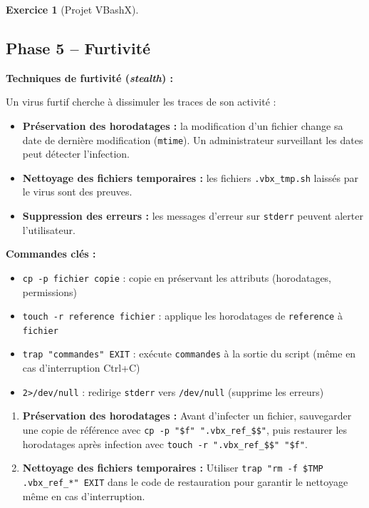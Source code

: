 \documentclass[a4paper,11pt]{article}
\theoremstyle{plain}
\theoremstyle{definition}
\newtheorem{exercice}{Exercice}
\begin{document}
\begin{exercice}[Projet VBashX]
\subsection*{Phase 5 -- Furtivité}

\begin{rappel}
\textbf{Techniques de furtivité (\textit{stealth}) :}

Un virus furtif cherche à dissimuler les traces de son activité :
\begin{itemize}
    \item \textbf{Préservation des horodatages :} la modification d'un fichier change sa date de dernière modification (\texttt{mtime}). Un administrateur surveillant les dates peut détecter l'infection.
    \item \textbf{Nettoyage des fichiers temporaires :} les fichiers \texttt{.vbx\_tmp.sh} laissés par le virus sont des preuves.
    \item \textbf{Suppression des erreurs :} les messages d'erreur sur \texttt{stderr} peuvent alerter l'utilisateur.
\end{itemize}

\textbf{Commandes clés :}
\begin{itemize}
    \item \texttt{cp -p fichier copie} : copie en préservant les attributs (horodatages, permissions)
    \item \texttt{touch -r reference fichier} : applique les horodatages de \texttt{reference} à \texttt{fichier}
    \item \texttt{trap "commandes" EXIT} : exécute \texttt{commandes} à la sortie du script (même en cas d'interruption Ctrl+C)
    \item \texttt{2>/dev/null} : redirige \texttt{stderr} vers \texttt{/dev/null} (supprime les erreurs)
\end{itemize}
\end{rappel}

\begin{enumerate}
\item[\textbf{5a)}] \textbf{Préservation des horodatages :} Avant d'infecter un fichier, sauvegarder une copie de référence avec \texttt{cp -p "\$f" ".vbx\_ref\_\$\$"}, puis restaurer les horodatages après infection avec \texttt{touch -r ".vbx\_ref\_\$\$" "\$f"}.

\item[\textbf{5b)}] \textbf{Nettoyage des fichiers temporaires :} Utiliser \texttt{trap "rm -f \$TMP .vbx\_ref\_*" EXIT} dans le code de restauration pour garantir le nettoyage même en cas d'interruption.


\end{enumerate}
\end{exercice}
\end{document}
